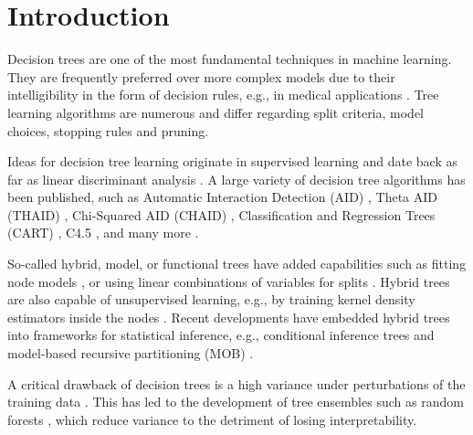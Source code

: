 \documentclass[a4paper, 11pt]{article}
\begin{document}
\section{Introduction}

Decision trees are one of the most fundamental techniques in machine learning. They are frequently preferred over more complex models due to their intelligibility in the form of decision rules, e.g., in medical applications \cite{podgorelec_trees_medicine}. Tree learning algorithms are numerous and differ regarding split criteria, model choices, stopping rules and pruning. \par
Ideas for decision tree learning originate in supervised learning and date back as far as linear discriminant analysis \cite{fisher_lda}. A large variety of decision tree algorithms has been published, such as Automatic Interaction Detection (AID) \cite{hawkins_AID}, Theta AID (THAID) \cite{ messenger_mandell_thaid}, Chi-Squared AID (CHAID) \cite{kass_chaid}, Classification and Regression Trees (CART) \cite{cart_1, hastie_elemstatlearn}, C4.5 \cite{quinlan_c45}, and many more \cite{loh_trees_review}.
\par
So-called hybrid, model, or functional trees \cite{zeileis_mob} have added capabilities such as fitting node models \cite{quinlan_model_tree}, or using linear combinations of variables for splits \cite{brodley_multivariate_trees}. Hybrid trees are also capable of unsupervised learning, e.g., by training kernel density estimators inside the nodes \cite{ram_density_estimation_tree}.
Recent developments have embedded hybrid trees into frameworks for  statistical inference, e.g., conditional inference trees \cite{hothorn_ctree} and model-based recursive partitioning (MOB) \cite{zeileis_mob}.
\par
A critical drawback of decision trees is a high variance under perturbations of the training data \cite{hastie_elemstatlearn}. This has led to the development of tree ensembles such as random forests \cite{breiman_randomforests}, which reduce variance to the detriment of losing interpretability.

\par
\end{document}
